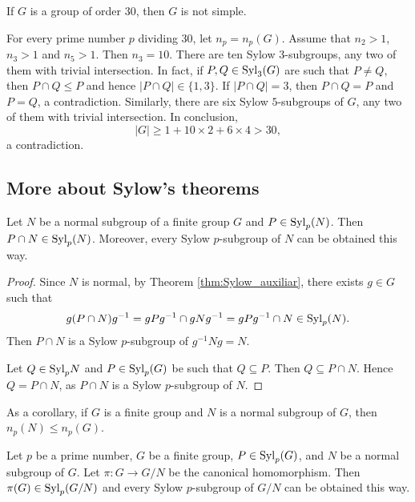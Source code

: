 \begin{example}
If $G$ is a group of order 30, then $G$ is not simple.

For every prime number $p$ dividing 30, let $n_p=n_p(G)$. Assume that
$n_2>1$, $n_3>1$ and $n_5>1$.
 Then $n_3=10$. There are ten 
Sylow $3$-subgroups, any two of them with trivial intersection. 
In fact, if $P,Q\in\mathrm{Syl}_3(G)$ are such that 
 $P\ne Q$, then $P\cap Q\leq P$ and hence 
$|P\cap Q|\in\{1,3\}$. If $|P\cap Q|=3$, then $P\cap Q=P$ and $P=Q$, a contradiction. Similarly, 
there are six Sylow $5$-subgroups of $G$, any two of them with 
trivial intersection. In conclusion,
\[
|G|\geq 1+10\times 2+6\times 4>30,
\]
a contradiction.
\end{example}


\subsection{More about Sylow's theorems}

\begin{theorem}
    Let $N$ be a normal subgroup of a finite group 
    $G$ and $P\in\mathrm{Syl}_p(N)$. Then 
    $P\cap N\in\mathrm{Syl}_p(N)$. Moreover, every Sylow 
    $p$-subgroup of $N$  
    can be obtained this way. 
\end{theorem}

\begin{proof}
    Since $N$ is normal,
    by Theorem \ref{thm:Sylow_auxiliar}, there exists 
    $g\in G$ such that 
        \[
                g(P\cap N)g^{-1}=gPg^{-1}\cap gNg^{-1}=gPg^{-1}\cap N\in\mathrm{Syl}_p(N).
        \]
    Then $P\cap N$ is a Sylow $p$-subgroup of $g^{-1}Ng=N$.

    Let $Q\in\mathrm{Syl}_pN$ and $P\in\mathrm{Syl}_p(G)$ be such that
    $Q\subseteq P$. Then
    $Q\subseteq P\cap N$. Hence 
    $Q=P\cap N$, as $P\cap N$ is a Sylow $p$-subgroup of $N$. 
\end{proof}

As a corollary, if $G$ is a finite group and 
$N$ is a normal subgroup of $G$, then 
$n_p(N)\leq n_p(G)$.

\begin{theorem}
    Let $p$ be a prime number, $G$ be a finite group, $P\in\mathrm{Syl}_p(G)$, 
    and $N$ be a normal subgroup of $G$. Let $\pi\colon G\to G/N$ be the canonical homomorphism. Then 
    $\pi(G)\in\mathrm{Syl}_p(G/N)$ and every Sylow 
    $p$-subgroup of $G/N$ can be obtained this way. 
\end{theorem}

